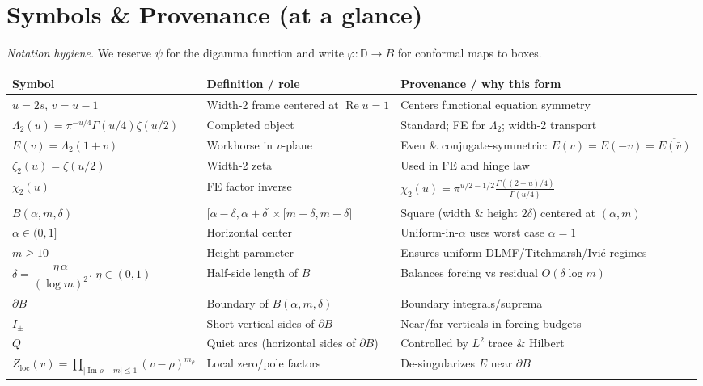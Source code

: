 \documentclass[11pt]{article}
\numberwithin{equation}{section}
\theoremstyle{remark}
\newcommand{\D}{\mathbb{D}}
\DeclareMathOperator{\Imag}{Im}
\DeclareMathOperator{\Real}{Re}
\newcommand{\LamTwo}{\Lambda_2}
\newcommand{\chiTwo}{\chi_2}
\newcommand{\Zloc}{Z_{\mathrm{loc}}}
\begin{document}
\section*{Symbols \& Provenance (at a glance)}

\noindent\textit{Notation hygiene.} We reserve $\psi$ for the digamma function and write $\varphi:\D\to B$ for conformal maps to boxes.

\medskip
\begin{tabularx}{\textwidth}{@{}p{3.2cm} L L@{}}
\toprule
\textbf{Symbol} & \textbf{Definition / role} & \textbf{Provenance / why this form}\\
\midrule
$u=2s$, $v=u-1$ & Width-2 frame centered at $\Real u=1$ & Centers functional equation symmetry\\[2pt]
$\LamTwo(u)=\pi^{-u/4}\Gamma(u/4)\zeta(u/2)$ & Completed object & Standard; FE for $\LamTwo$; width-2 transport\\[2pt]
$E(v)=\LamTwo(1+v)$ & Workhorse in $v$-plane & Even \& conjugate-symmetric: $E(v)=E(-v)=\overline{E(\bar v)}$\\[2pt]
$\zeta_2(u)=\zeta(u/2)$ & Width-2 zeta & Used in FE and hinge law\\[2pt]
$\chiTwo(u)$ & FE factor inverse & $\chiTwo(u)=\pi^{u/2-1/2}\frac{\Gamma((2-u)/4)}{\Gamma(u/4)}$\\[2pt]
$B(\alpha,m,\delta)$ & $\big[\alpha-\delta,\alpha+\delta\big]\times\big[m-\delta,m+\delta\big]$ & Square (width \& height $2\delta$) centered at $(\alpha,m)$\\[2pt]
$\alpha\in(0,1]$ & Horizontal center & Uniform-in-$\alpha$ uses worst case $\alpha=1$\\[2pt]
$m\ge 10$ & Height parameter & Ensures uniform DLMF/Titchmarsh/Ivi\'c regimes\\[2pt]
$\delta=\dfrac{\eta\,\alpha}{(\log m)^2}$, $\eta\in(0,1)$ & Half-side length of $B$ & Balances forcing vs residual $O(\delta\log m)$\\[4pt]
$\partial B$ & Boundary of $B(\alpha,m,\delta)$ & Boundary integrals/suprema\\[2pt]
$I_\pm$ & Short vertical sides of $\partial B$ & Near/far verticals in forcing budgets\\[2pt]
$Q$ & Quiet arcs (horizontal sides of $\partial B$) & Controlled by $L^2$ trace \& Hilbert\\[2pt]
$\Zloc(v)=\prod_{|\Imag\rho-m|\le 1}(v-\rho)^{m_\rho}$ & Local zero/pole factors & De-singularizes $E$ near $\partial B$\\[2pt]

\end{tabularx}
\end{document}
